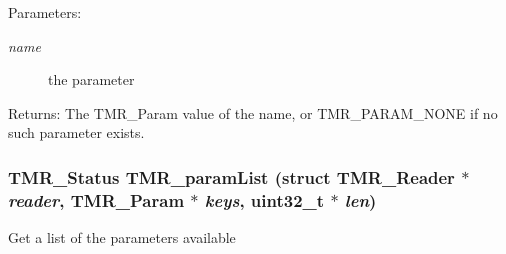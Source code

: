 \begin{Desc}
\item[Parameters:]
\begin{description}
\item[{\em name}]the parameter \end{description}
\end{Desc}
\begin{Desc}
\item[Returns:]The TMR\_\-Param value of the name, or TMR\_\-PARAM\_\-NONE if no such parameter exists. \end{Desc}
\hypertarget{group__reader_gb0b455295d4984b2fa653f2ebccc263e}{
\subsubsection[{TMR\_\-paramList}]{\setlength{\rightskip}{0pt plus 5cm}TMR\_\-Status TMR\_\-paramList (struct {\bf TMR\_\-Reader} $\ast$ {\em reader}, \/  {\bf TMR\_\-Param} $\ast$ {\em keys}, \/  uint32\_\-t $\ast$ {\em len})}}
\label{group__reader_gb0b455295d4984b2fa653f2ebccc263e}


Get a list of the parameters available

